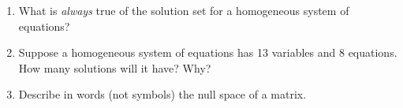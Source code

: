 \begin{enumerate}
%
\item What is {\em always} true of the solution set for a homogeneous system of equations?
%
\item Suppose a homogeneous system of equations has 13 variables and 8 equations.  How many solutions will it have?  Why?
%
\item Describe in words (not symbols) the null space of a matrix.
%
\end{enumerate}

